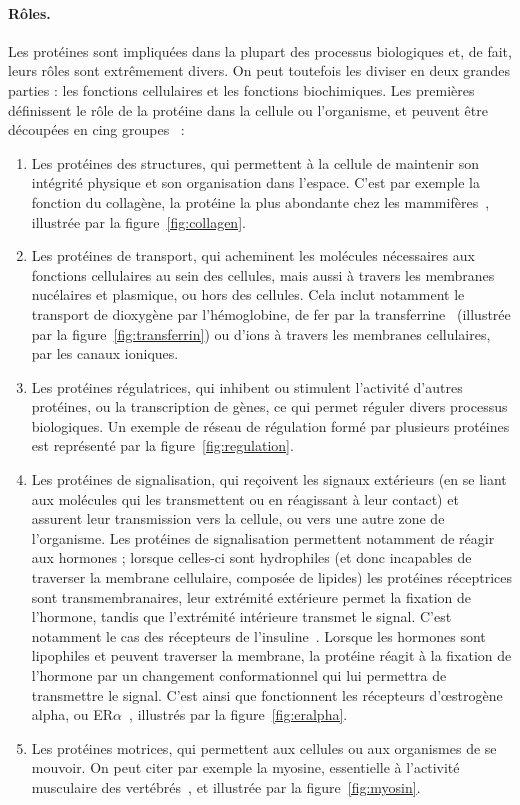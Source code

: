 	\paragraph{Rôles.}
	Les protéines sont impliquées dans la plupart des processus biologiques et, de fait, leurs rôles sont extrêmement divers. On peut toutefois les diviser en deux grandes parties : les fonctions cellulaires et les fonctions biochimiques. Les premières définissent le rôle de la protéine dans la cellule ou l'organisme, et peuvent être découpées en cing groupes~\cite{lodish1995molecular} :
	\begin{enumerate}
		\item Les protéines des structures, qui permettent à la cellule de maintenir son intégrité physique et son organisation dans l'espace. C'est par exemple la fonction du collagène, la protéine la plus abondante chez les mammifères~\cite{di2002mapping}, illustrée par la figure~\ref{fig:collagen}.
		\item Les protéines de transport, qui acheminent les molécules nécessaires aux fonctions cellulaires au sein des cellules, mais aussi à travers les membranes nucélaires et plasmique, ou hors des cellules. Cela inclut notamment le transport de dioxygène par l'hémoglobine, de fer par la transferrine~\cite{crichton1987iron} (illustrée par la figure~\ref{fig:transferrin}) ou d'ions à travers les membranes cellulaires, par les canaux ioniques. 
		\item Les protéines régulatrices, qui inhibent ou stimulent l'activité d'autres protéines, ou la transcription de gènes, ce qui permet réguler divers processus biologiques. Un exemple de réseau de régulation formé par plusieurs protéines est représenté par la figure~\ref{fig:regulation}.
		\item Les protéines de signalisation, qui reçoivent les signaux extérieurs (en se liant aux molécules qui les transmettent ou en réagissant à leur contact) et assurent leur transmission vers la cellule, ou vers une autre zone de l'organisme. Les protéines de signalisation permettent notamment de réagir aux hormones ; lorsque celles-ci sont hydrophiles (et donc incapables de traverser la membrane cellulaire, composée de lipides) les protéines réceptrices sont transmembranaires, leur extrémité extérieure permet la fixation de l'hormone, tandis que l'extrémité intérieure transmet le signal. C'est notamment le cas des récepteurs de l'insuline~\cite{gammeltoft1984insulin}. Lorsque les hormones sont lipophiles et peuvent traverser la membrane, la protéine réagit à la fixation de l'hormone par un changement conformationnel qui lui permettra de transmettre le signal. C'est ainsi que fonctionnent les récepteurs d'œstrogène alpha, ou ER$\alpha$~\cite{dahlman2006international}, illustrés par la figure~\ref{fig:eralpha}.
		\item Les protéines motrices, qui permettent aux cellules ou aux organismes de se mouvoir. On peut citer par exemple la myosine, essentielle à l'activité musculaire des vertébrés~\cite{pollard1973acanthamoeba}, et illustrée par la figure~\ref{fig:myosin}.
	\end{enumerate}	

